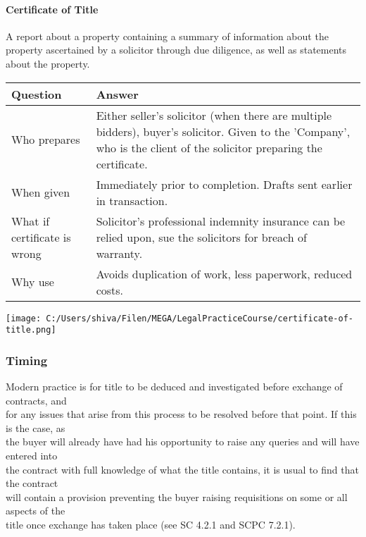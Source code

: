 \documentclass[
]{article}
\begin{document}
\hypertarget{certificate-of-title}{%
\paragraph{Certificate of Title}\label{certificate-of-title}}

A report about a property containing a summary of information about the
property ascertained by a solicitor through due diligence, as well as
statements about the property.

\begin{longtable}[]{@{}ll@{}}
\toprule()
Question & Answer \\
\midrule()
\endhead
Who prepares & Either seller's solicitor (when there are multiple
bidders), buyer's solicitor. Given to the 'Company', who is the client
of the solicitor preparing the certificate. \\
When given & Immediately prior to completion. Drafts sent earlier in
transaction. \\
What if certificate is wrong & Solicitor's professional indemnity
insurance can be relied upon, sue the solicitors for breach of
warranty. \\
Why use & Avoids duplication of work, less paperwork, reduced costs. \\
\bottomrule()
\end{longtable}

\texttt{[image: C:/Users/shiva/Filen/MEGA/LegalPracticeCourse/certificate-of-title.png]}

\hypertarget{timing-1}{%
\subsubsection{Timing}\label{timing-1}}

Modern practice is for title to be deduced and investigated before
exchange of contracts, and\\
for any issues that arise from this process to be resolved before that
point. If this is the case, as\\
the buyer will already have had his opportunity to raise any queries and
will have entered into\\
the contract with full knowledge of what the title contains, it is usual
to find that the contract\\
will contain a provision preventing the buyer raising requisitions on
some or all aspects of the\\
title once exchange has taken place (see SC 4.2.1 and SCPC 7.2.1).
\end{document}
